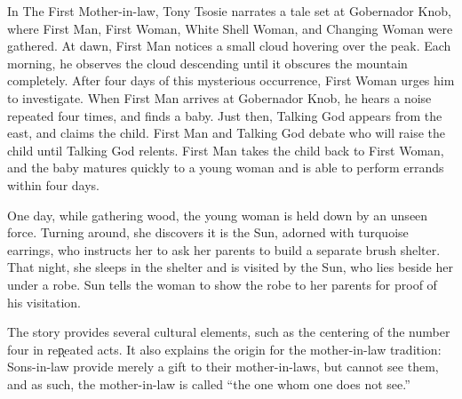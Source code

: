 In The First Mother-in-law, Tony Tsosie narrates a tale set at Gobernador Knob, where First Man, First Woman, White Shell Woman, and Changing Woman were gathered. At dawn, First Man notices a small cloud hovering over the peak. Each morning, he observes the cloud descending until it obscures the mountain completely. After four days of this mysterious occurrence, First Woman urges him to investigate. When First Man arrives at Gobernador Knob, he hears a noise repeated four times, and finds a baby. Just then, Talking God appears from the east, and claims the child. First Man and Talking God debate who will raise the child until Talking God relents. First Man takes the child back to First Woman, and the baby matures quickly to a young woman and is able to perform errands within four days.

One day, while gathering wood, the young woman is held down by an unseen force. Turning around, she discovers it is the Sun, adorned with turquoise earrings, who instructs her to ask her parents to build a separate brush shelter. That night, she sleeps in the shelter and is visited by the Sun, who lies beside her under a robe. Sun tells the woman to show the robe to her parents for proof of his visitation. 

The story provides several cultural elements, such as the centering of the number four in rep̨eated acts. It also explains the origin for the mother-in-law tradition: Sons-in-law provide merely a gift to their mother-in-laws, but cannot see them, and as such, the mother-in-law is called ``the one whom one does not see.''
